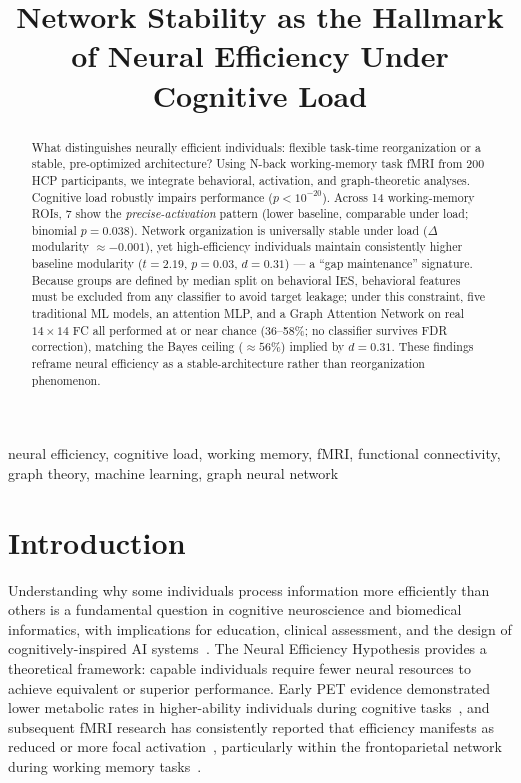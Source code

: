 \documentclass[conference]{IEEEtran}
\begin{document}
\title{Network Stability as the Hallmark of Neural Efficiency Under Cognitive Load}

\author{
}

\maketitle

\begin{abstract}
What distinguishes neurally efficient individuals: flexible task-time reorganization or a stable, pre-optimized architecture? Using N-back working-memory task fMRI from 200 HCP participants, we integrate behavioral, activation, and graph-theoretic analyses. Cognitive load robustly impairs performance ($p<10^{-20}$). Across 14 working-memory ROIs, 7 show the \emph{precise-activation} pattern (lower baseline, comparable under load; binomial $p=0.038$). Network organization is universally stable under load ($\Delta$ modularity $\approx -0.001$), yet high-efficiency individuals maintain consistently higher baseline modularity ($t=2.19$, $p=0.03$, $d=0.31$) — a ``gap maintenance'' signature. Because groups are defined by median split on behavioral IES, behavioral features must be excluded from any classifier to avoid target leakage; under this constraint, five traditional ML models, an attention MLP, and a Graph Attention Network on real $14\times14$ FC all performed at or near chance (36--58\%; no classifier survives FDR correction), matching the Bayes ceiling ($\approx 56\%$) implied by $d=0.31$. These findings reframe neural efficiency as a stable-architecture rather than reorganization phenomenon.
\end{abstract}

\begin{IEEEkeywords}
neural efficiency, cognitive load, working memory, fMRI, functional connectivity, graph theory, machine learning, graph neural network
\end{IEEEkeywords}

\section{Introduction}

Understanding why some individuals process information more efficiently than others is a fundamental question in cognitive neuroscience and biomedical informatics, with implications for education, clinical assessment, and the design of cognitively-inspired AI systems~\cite{deary2010neuroscience}. The Neural Efficiency Hypothesis provides a theoretical framework: capable individuals require fewer neural resources to achieve equivalent or superior performance. Early PET evidence demonstrated lower metabolic rates in higher-ability individuals during cognitive tasks~\cite{haier1988cortical}, and subsequent fMRI research has consistently reported that efficiency manifests as reduced or more focal activation~\cite{neubauer2009intelligence}, particularly within the frontoparietal network during working memory tasks~\cite{rottschy2012modelling}.
\end{document}
